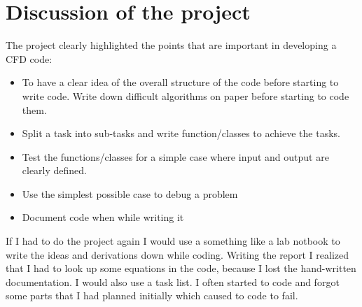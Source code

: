 \section{Discussion of the project}
The project clearly highlighted the points that are important in developing a CFD code:
\begin{itemize}
\item To have a clear idea of the overall structure of the code before starting to write code. Write down difficult algorithms on paper before starting to code them.
\item Split a task into sub-tasks and write function/classes to achieve the tasks.
\item Test the functions/classes for a simple case where input and output are clearly defined.
\item Use the simplest possible case to debug a problem
\item Document code when while writing it
\end{itemize}
If I had to do the project again I would use a something like a lab notbook to write the ideas and derivations down while coding. Writing the report I realized that I had to look up some equations in the code, because I lost the hand-written documentation. I would also use a task list. I often started to code and forgot some parts that I had planned initially which caused to code to fail. 